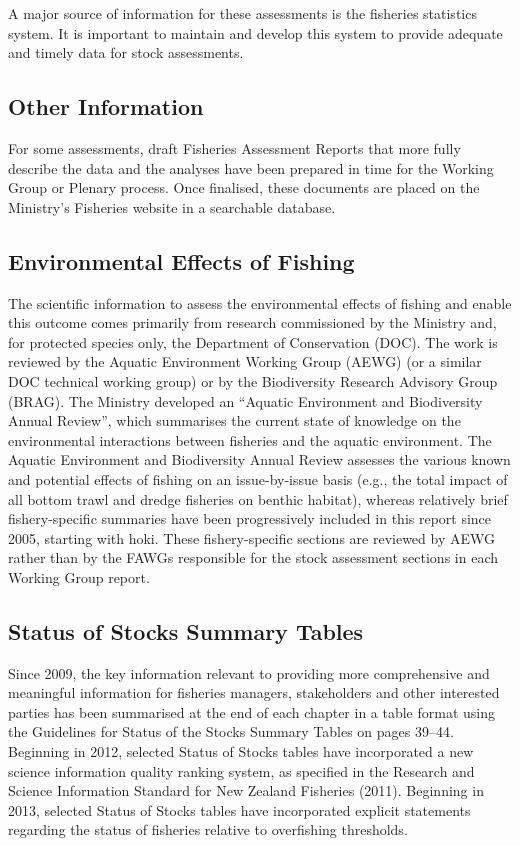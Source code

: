 \documentclass{mpi-plenary}
\newcounter{chapter}
\theoremstyle{definition}
\theoremstyle{definition}
\theoremstyle{definition}
\theoremstyle{remark}
\begin{document}
A major source of information for these assessments is the fisheries
statistics system. It is important to maintain and develop this system
to provide adequate and timely data for stock assessments.

\subsection{Other Information}\label{other-information}

For some assessments, draft Fisheries Assessment Reports that more fully
describe the data and the analyses have been prepared in time for the
Working Group or Plenary process. Once finalised, these documents are
placed on the Ministry's Fisheries website in a searchable database.

\subsection{Environmental Effects of
Fishing}\label{environmental-effects-of-fishing}

The scientific information to assess the environmental effects of
fishing and enable this outcome comes primarily from research
commissioned by the Ministry and, for protected species only, the
Department of Conservation (DOC). The work is reviewed by the Aquatic
Environment Working Group (AEWG) (or a similar DOC technical working
group) or by the Biodiversity Research Advisory Group (BRAG). The
Ministry developed an ``Aquatic Environment and Biodiversity Annual
Review'', which summarises the current state of knowledge on the
environmental interactions between fisheries and the aquatic
environment. The Aquatic Environment and Biodiversity Annual Review
assesses the various known and potential effects of fishing on an
issue-by-issue basis (e.g., the total impact of all bottom trawl and
dredge fisheries on benthic habitat), whereas relatively brief
fishery-specific summaries have been progressively included in this
report since 2005, starting with hoki. These fishery-specific sections
are reviewed by AEWG rather than by the FAWGs responsible for the stock
assessment sections in each Working Group report.

\subsection{Status of Stocks Summary
Tables}\label{status-of-stocks-summary-tables}

Since 2009, the key information relevant to providing more comprehensive
and meaningful information for fisheries managers, stakeholders and
other interested parties has been summarised at the end of each chapter
in a table format using the Guidelines for Status of the Stocks Summary
Tables on pages 39--44. Beginning in 2012, selected Status of Stocks
tables have incorporated a new science information quality ranking
system, as specified in the Research and Science Information Standard
for New Zealand Fisheries (2011). Beginning in 2013, selected Status of
Stocks tables have incorporated explicit statements regarding the status
of fisheries relative to overfishing thresholds.
\end{document}
